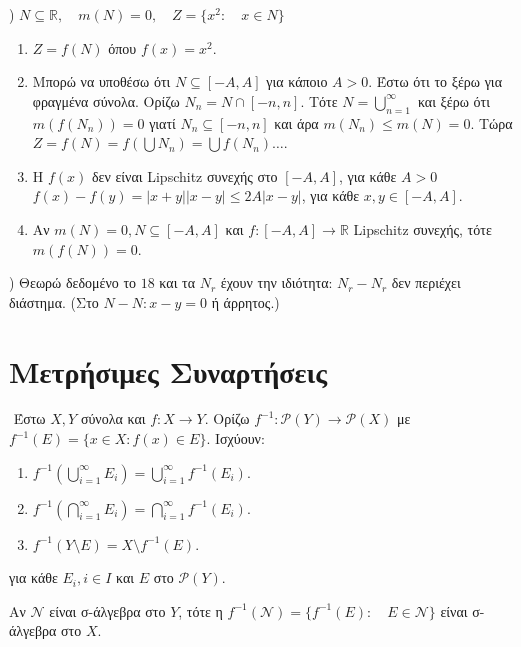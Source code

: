 $ $) $N \subseteq \mathbb{R},\quad  m(N)= 0, \quad  Z = \{x^2: \quad x\in N\}$
\begin{enumerate}
    \item $Z = f(N)$ όπου $f(x) = x^2$.
    \item Μπορώ να υποθέσω ότι $N \subseteq [-A,A]$ για κάποιο $A >0$. Έστω ότι το ξέρω για φραγμένα σύνολα. Ορίζω $N_n = N\cap [-n,n]$. Τότε $N = \bigcup\limits_{n=1}^{\infty}$ και ξέρω ότι $m(f(N_n)) = 0$ γιατί $N_n \subseteq [-n,n]$ και άρα $m(N_n) \leq m(N) = 0$. Τώρα $Z = f(N) = f\left(\bigcup N_n\right) = \bigcup f(N_n) \ldots$.
    \item Η $f(x)$ δεν είναι {\eng Lipschitz} συνεχής στο $[-A,A]$, για κάθε $A>0$ $f(x)- f(y) = |x+y||x-y|\leq 2A|x-y|$, για κάθε $x,y \in [-A,A]$.
    \item Αν $m(N) = 0, N\subseteq[-A,A]$ και $f: [-A,A] \rightarrow \mathbb{R}$ {\eng Lipschitz} συνεχής, τότε $m(f(N)) = 0$.
\end{enumerate}

$ $) Θεωρώ δεδομένο το $18$ και τα $N_r$ έχουν την ιδιότητα: $N_r - N_r$ δεν περιέχει διάστημα. (Στο $N - N: x-y = 0$ ή άρρητος.)


\pagebreak

\section*{Μετρήσιμες Συναρτήσεις}

$ $\newline
Έστω $X,Y$ σύνολα και $f:X \rightarrow Y$. Ορίζω $f^{-1}: \mathcal{P}(Y) \rightarrow \mathcal{P}(X)$ με $f^{-1}(E) = \{x \in X: f(x) \in E\}$. Ισχύουν:
\begin{enumerate}
    \item $f^{-1}\left(\bigcup\limits_{i=1}^{\infty} E_i \right) = \bigcup\limits_{i=1}^{\infty} f^{-1}(E_i)$.
    \item $f^{-1}\left(\bigcap\limits_{i=1}^{\infty} E_i \right) = \bigcap\limits_{i=1}^{\infty} f^{-1}(E_i)$.
    \item $f^{-1}(Y\setminus E) = X\setminus f^{-1}(E)$.
\end{enumerate}


για κάθε $E_i, i \in I$ και $E$ στο $\mathcal{P}(Y)$.


\begin{lemma} Αν $\mathcal{N}$ είναι σ-άλγεβρα στο $Y$, τότε η $f^{-1}(\mathcal{N}) = \{f^{-1}(E): \quad E\in \mathcal{N}\}$ είναι σ-άλγεβρα στο $X$.
\end{lemma}

